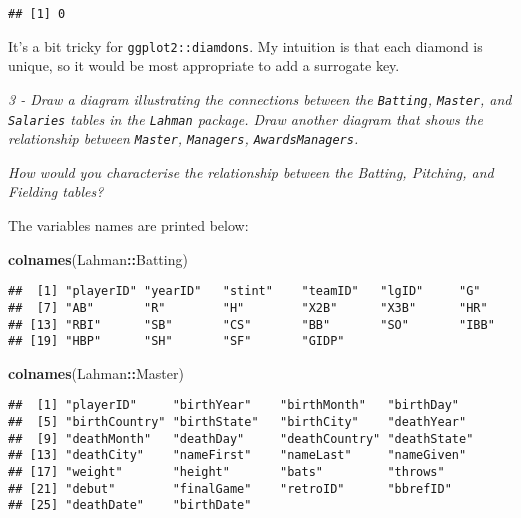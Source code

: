 \documentclass[]{article}
\newenvironment{Shaded}{\begin{snugshade}}{\end{snugshade}}
\newcommand{\KeywordTok}[1]{\textcolor[rgb]{0.13,0.29,0.53}{\textbf{#1}}}
\newcommand{\OperatorTok}[1]{\textcolor[rgb]{0.81,0.36,0.00}{\textbf{#1}}}
\newcommand{\NormalTok}[1]{#1}
\theoremstyle{definition}
\theoremstyle{definition}
\theoremstyle{definition}
\theoremstyle{remark}
\begin{document}
\begin{verbatim}
## [1] 0
\end{verbatim}

It's a bit tricky for \texttt{ggplot2::diamdons}. My intuition is that
each diamond is unique, so it would be most appropriate to add a
surrogate key.

\emph{3 - Draw a diagram illustrating the connections between the
\texttt{Batting}, \texttt{Master}, and \texttt{Salaries} tables in the
\texttt{Lahman} package. Draw another diagram that shows the
relationship between \texttt{Master}, \texttt{Managers},
\texttt{AwardsManagers}.}

\emph{How would you characterise the relationship between the Batting,
Pitching, and Fielding tables?}

The variables names are printed below:

\begin{Shaded}
\begin{Highlighting}[]
\KeywordTok{colnames}\NormalTok{(Lahman}\OperatorTok{::}\NormalTok{Batting)}
\end{Highlighting}
\end{Shaded}

\begin{verbatim}
##  [1] "playerID" "yearID"   "stint"    "teamID"   "lgID"     "G"       
##  [7] "AB"       "R"        "H"        "X2B"      "X3B"      "HR"      
## [13] "RBI"      "SB"       "CS"       "BB"       "SO"       "IBB"     
## [19] "HBP"      "SH"       "SF"       "GIDP"
\end{verbatim}

\begin{Shaded}
\begin{Highlighting}[]
\KeywordTok{colnames}\NormalTok{(Lahman}\OperatorTok{::}\NormalTok{Master)}
\end{Highlighting}
\end{Shaded}

\begin{verbatim}
##  [1] "playerID"     "birthYear"    "birthMonth"   "birthDay"    
##  [5] "birthCountry" "birthState"   "birthCity"    "deathYear"   
##  [9] "deathMonth"   "deathDay"     "deathCountry" "deathState"  
## [13] "deathCity"    "nameFirst"    "nameLast"     "nameGiven"   
## [17] "weight"       "height"       "bats"         "throws"      
## [21] "debut"        "finalGame"    "retroID"      "bbrefID"     
## [25] "deathDate"    "birthDate"
\end{verbatim}
\end{document}

